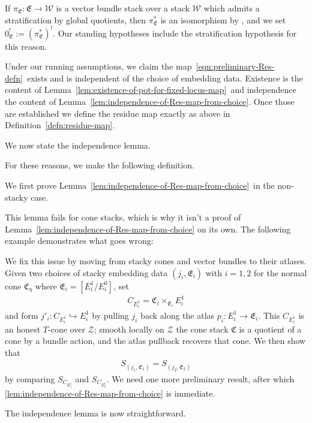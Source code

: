  If \(\pi_{\mathfrak E}:\mathfrak E\to \mathcal W\) is a vector bundle stack over a stack \(\mathcal W\) which admits a stratification by global quotients, then \(\pi^*_{\mathfrak E}\) is an isomorphism by \cite[Prop. 5.3.2]{kresch_CycleGroupsArtin1999}, and we set \(0^!_{\mathfrak E} := (\pi^*_{\mathfrak E})^!\). Our standing hypotheses include the stratification hypothesis for this reason.


Under our running assumptions, we claim the map~\eqref{eqn:preliminary-Res-defn}~exists and is independent of the choice of embedding data. Existence is the content of Lemma~\ref{lem:existence-of-pot-for-fixed-locus-map}~and independence the content of Lemma~\ref{lem:independence-of-Res-map-from-choice}. Once those are established we define the residue map exactly as above in Definition~\ref{defn:residue-map}.




We now state the independence lemma.



For these reasons, we make the following definition.


We first prove Lemma~\ref{lem:independence-of-Res-map-from-choice}~in the non-stacky case.



This lemma fails for cone stacks, which is why it isn't a proof of Lemma~\ref{lem:independence-of-Res-map-from-choice} on its own. The following example demonstrates what goes wrong:


We fix this issue by moving from stacky cones and vector bundles to their atlases. Given two choices of stacky embedding data \((j_i, \mathfrak E_i)\) with \(i=1,2\) for the normal cone \(\mathfrak C_\eta\) where \(\mathfrak E_i = [E^1_i/E^0_i]\), set
\begin{align*}
  C_{E^1_i} = \mathfrak C_i\times_{\mathfrak E_i}E^1_i
\end{align*}
and form \(j'_i:C_{E_i^1}\hookrightarrow E_i^1\) by pulling \(j_i\) back along the atlas \(p_i:E^1_i\to \mathfrak E_i\). This \(C_{E^1_i}\) is an honest \(T\)-cone over \(\mathcal Z\); smooth locally on \(\mathcal Z\) the cone stack \(\mathfrak C\) is a quotient of a cone by a bundle action, and the atlas pullback recovers that cone. We then show that
\begin{align*}
  S_{(j_1, \mathfrak E_1)} = S_{(j_2, \mathfrak E_2)}
\end{align*}
by comparing \(S_{C_{E^1_1}}\) and \(S_{C_{E^1_2}}\). We need one more preliminary result, after which \ref{lem:independence-of-Res-map-from-choice} is immediate.



The independence lemma is now straightforward.



